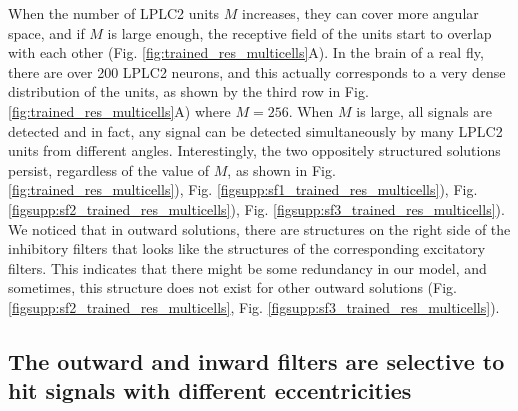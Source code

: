 \documentclass[pdftex,9pt,lineno]{elife}
\begin{document}
When the number of LPLC2 units $M$ increases, they can cover more angular space, and if $M$ is large enough, the receptive field of the units start to overlap with each other (Fig. \ref{fig:trained_res_multicells}A). In the brain of a real fly, there are over 200 LPLC2 neurons, and this actually corresponds to a very dense distribution of the units, as shown by the third row in Fig. \ref{fig:trained_res_multicells}A) where $M=256$. When $M$ is large, all signals are detected and in fact, any signal can be detected simultaneously by many LPLC2 units from different angles. Interestingly, the two oppositely structured solutions persist, regardless of the value of $M$, as shown in Fig. \ref{fig:trained_res_multicells}), Fig. \ref{figsupp:sf1_trained_res_multicells}), Fig. \ref{figsupp:sf2_trained_res_multicells}), Fig. \ref{figsupp:sf3_trained_res_multicells}). We noticed that in outward solutions, there are structures on the right side of the inhibitory filters that looks like the structures of the corresponding excitatory filters. This indicates that there might be some redundancy in our model, and sometimes, this structure does not exist for other outward solutions (Fig. \ref{figsupp:sf2_trained_res_multicells}, Fig. \ref{figsupp:sf3_trained_res_multicells}).


\subsection{The outward and inward filters are selective to hit signals with different eccentricities}




\end{document}
